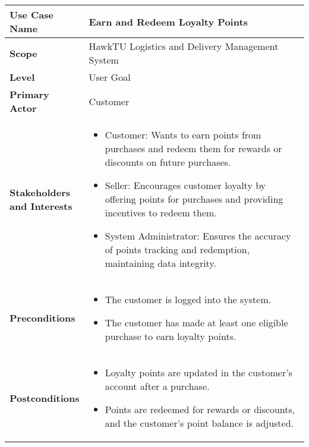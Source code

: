\documentclass{article}
\begin{document}
\begin{longtable}{|>{\raggedright\arraybackslash}m{0.25\linewidth}|m{0.75\linewidth}|}
\hline
\textbf{Use Case Name} & Earn and Redeem Loyalty Points \\
\hline
\textbf{Scope} & HawkTU Logistics and Delivery Management System \\
\hline
\textbf{Level} & User Goal \\
\hline
\textbf{Primary Actor} & Customer \\
\hline
\textbf{Stakeholders and Interests} & 
\begin{itemize}
    \item Customer: Wants to earn points from purchases and redeem them for rewards or discounts on future purchases.
    \item Seller: Encourages customer loyalty by offering points for purchases and providing incentives to redeem them.
    \item System Administrator: Ensures the accuracy of points tracking and redemption, maintaining data integrity.
\end{itemize} \\
\hline
\textbf{Preconditions} & 
\begin{itemize}
    \item The customer is logged into the system.
    \item The customer has made at least one eligible purchase to earn loyalty points.
\end{itemize} \\
\hline
\textbf{Postconditions} & 
\begin{itemize}
    \item Loyalty points are updated in the customer’s account after a purchase.
    \item Points are redeemed for rewards or discounts, and the customer's point balance is adjusted.
\end{itemize} \\
\hline
\end{longtable}

\vspace{-2.45em}
\end{document}
